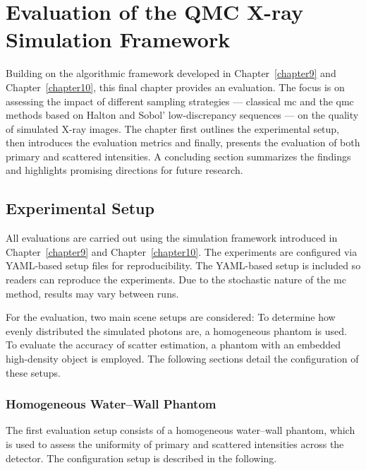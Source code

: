 
\chapter{Evaluation of the QMC X-ray Simulation Framework}
\label{chapter11}

Building on the algorithmic framework developed in Chapter~\ref{chapter9} and
Chapter~\ref{chapter10}, this final chapter provides an evaluation. The focus is
on assessing the impact of different sampling strategies --- classical \acl{mc}
and the \acl{qmc} methods based on Halton and Sobol' low-discrepancy sequences
--- on the quality of simulated X-ray images. The chapter first outlines the
experimental setup, then introduces the evaluation metrics and finally, presents
the evaluation of both primary and scattered intensities. A concluding section
summarizes the findings and highlights promising directions for future research.

\section{Experimental Setup}
\label{sec:experimental_setup}

All evaluations are carried out using the simulation framework introduced in
Chapter~\ref{chapter9} and Chapter~\ref{chapter10}. The experiments are
configured via YAML-based setup files for reproducibility. The YAML-based setup
is included so readers can reproduce the experiments. Due to the stochastic
nature of the \ac{mc} method, results may vary between runs.

For the evaluation, two main scene setups are considered: To determine how
evenly distributed the simulated photons are, a homogeneous phantom is used. To
evaluate the accuracy of scatter estimation, a phantom with an embedded
high-density object is employed. The following sections detail the
configuration of these setups. 

\subsection{Homogeneous Water--Wall Phantom}
\label{sec:water_wall_phantom}

The first evaluation setup consists of a homogeneous water--wall phantom, which
is used to assess the uniformity of primary and scattered intensities across the
detector. The configuration setup is described in the following.

